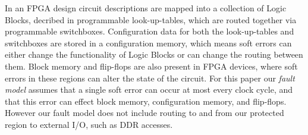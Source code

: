 In an FPGA design circuit descriptions are mapped into a collection of Logic Blocks, decribed in programmable look-up-tables,
which are routed together via programmable switchboxes.
Configuration data for both the look-up-tables and switchboxes are stored in a configuration memory, which means soft errors
can either change the functionality of Logic Blocks or can change the routing between them.
Block memory and flip-flops are also present in FPGA devices, where soft errors in these regions can alter the state of the circuit.
For this paper our \emph{fault model} assumes that a single soft error can occur at most every clock cycle, and that this error can effect block memory, configuration memory, and flip-flops. 
However our fault model does not include routing to and from our protected region to external I/O, such as DDR accesses.


